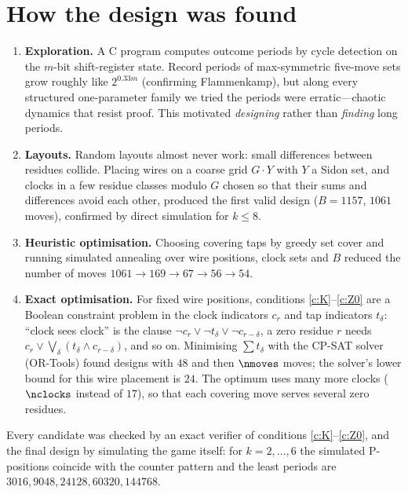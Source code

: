 \section{How the design was found}\label{sec:search}

\begin{enumerate}[leftmargin=*]
\item \textbf{Exploration.}  A C program computes outcome periods by cycle detection on the
$m$-bit shift-register state.  Record periods of max-symmetric five-move sets grow roughly like
$2^{0.33m}$ (confirming Flammenkamp), but along every structured one-parameter family we tried the
periods were erratic---chaotic dynamics that resist proof.  This motivated \emph{designing} rather
than \emph{finding} long periods.
\item \textbf{Layouts.}  Random layouts almost never work: small differences between residues
collide.  Placing wires on a coarse grid $G\cdot Y$ with $Y$ a Sidon set, and clocks in a few
residue classes modulo $G$ chosen so that their sums and differences avoid each other, produced the
first valid design ($B=1157$, $1061$ moves), confirmed by direct simulation for $k\le 8$.
\item \textbf{Heuristic optimisation.}  Choosing covering taps by greedy set cover and running
simulated annealing over wire positions, clock sets and $B$ reduced the number of moves
$1061\to169\to 67\to 56\to 54$.
\item \textbf{Exact optimisation.}  For fixed wire positions, conditions \ref{c:K}--\ref{c:Z0} are
a Boolean constraint problem in the clock indicators $c_r$ and tap indicators $t_\delta$:
``clock sees clock'' is the clause $\neg c_r\vee\neg t_\delta\vee\neg c_{r-\delta}$, a zero residue $r$
needs $c_r\vee\bigvee_\delta(t_\delta\wedge c_{r-\delta})$, and so on.  Minimising $\sum t_\delta$ with the
CP-SAT solver (OR-Tools) found designs with $48$ and then $\nmoves$ moves; the solver's lower bound
for this wire placement is $24$.  The optimum uses many more clocks ($\nclocks$ instead of $17$), so that
each covering move serves several zero residues.
\end{enumerate}
Every candidate was checked by an exact verifier of conditions \ref{c:K}--\ref{c:Z0}, and the final
design by simulating the game itself: for $k=2,\dots,6$ the simulated P-positions coincide with the
counter pattern and the least periods are $3016,9048,24128,60320,144768$.

